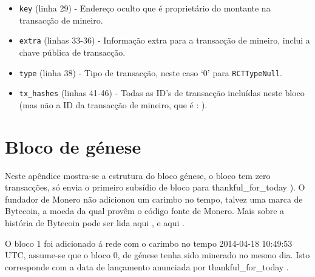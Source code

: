 \begin{itemize}
    \item {\tt key} (linha 29) - Endereço oculto que é proprietário do montante na transacção de mineiro.
    \item {\tt extra} (linhas 33-36) - Informação extra para a transacção de mineiro, inclui a chave pública de transacção.
    \item {\tt type} (linha 38) - Tipo de transacção, neste caso `0' para {\tt RCTTypeNull}.  
    \item {\tt tx\_hashes} (linhas 41-46) - Todas as ID's de transacção incluídas neste bloco (mas não a ID da transacção de mineiro, que é : ).
\end{itemize}

\chapter{Bloco de génese}
\label{appendix:genesis-block}

Neste apêndice mostra-se a estrutura do bloco génese, o bloco tem zero transacções, só envia o primeiro subsídio de bloco para thankful\_for\_today \cite{bitmonero-launched}). O fundador de Monero não adicionou um carimbo no tempo, talvez uma marca de Bytecoin, a moeda da qual provêm o código fonte de Monero. Mais sobre a história de Bytecoin pode ser lida aqui \cite{monero-history}, e aqui \cite{bytecoin-network}.  

O bloco 1 foi adicionado á rede com o carimbo no tempo 2014-04-18 10:49:53 UTC, assume-se que o bloco 0, de génese tenha sido minerado no mesmo dia. Isto corresponde com a data de lançamento anunciada por thankful\_for\_today \cite{bitmonero-launched}.

